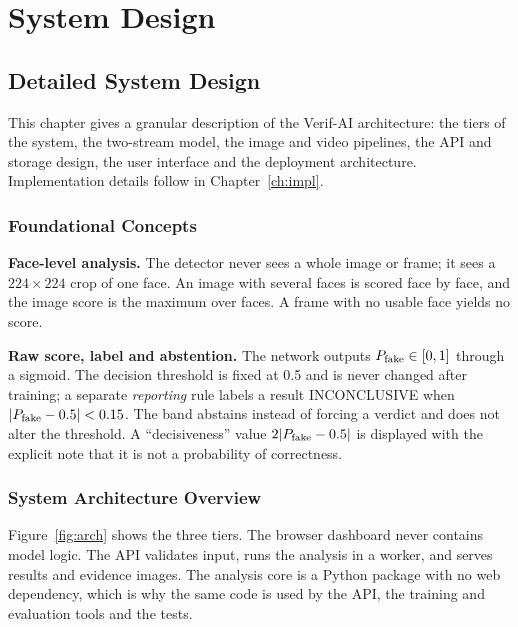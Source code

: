 \chapter{System Design}
\label{ch:design}

\section{Detailed System Design}
This chapter gives a granular description of the Verif-AI architecture: the tiers of the system, the two-stream model, the image and video
pipelines, the API and storage design, the user interface and the deployment architecture. Implementation details follow in
Chapter~\ref{ch:impl}.

\subsection{Foundational Concepts}
\textbf{Face-level analysis.} The detector never sees a whole image or frame; it sees a $224\times224$ crop of one face. An image with
several faces is scored face by face, and the image score is the maximum over faces. A frame with no usable face yields no score.

\textbf{Raw score, label and abstention.} The network outputs $P_{\mathrm{fake}}\in[0,1]$ through a sigmoid. The decision threshold is fixed at 0.5 and is never
changed after training; a separate \emph{reporting} rule labels a result INCONCLUSIVE when $|P_{\mathrm{fake}}-0.5|<0.15$. The band abstains instead of
forcing a verdict and does not alter the threshold. A ``decisiveness'' value $2|P_{\mathrm{fake}}-0.5|$ is displayed with the explicit note that it is not a
probability of correctness.

\subsection{System Architecture Overview}
Figure~\ref{fig:arch} shows the three tiers. The browser dashboard never contains model logic. The API validates input, runs the analysis in
a worker, and serves results and evidence images. The analysis core is a Python package with no web dependency, which is why the same code is used
by the API, the training and evaluation tools and the tests.

